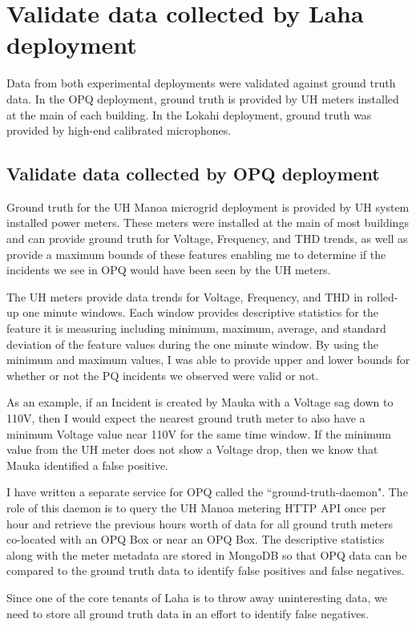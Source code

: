 \section{Validate data collected by Laha deployment}
Data from both experimental deployments were validated against ground truth data. In the OPQ deployment, ground truth is provided by UH meters installed at the main of each building. In the Lokahi deployment, ground truth was provided by high-end calibrated microphones. 

\subsection{Validate data collected by OPQ deployment}

Ground truth for the UH Manoa microgrid deployment is provided by UH system installed power meters. These meters were installed at the main of most buildings and can provide ground truth for Voltage, Frequency, and THD trends, as well as provide a maximum bounds of these features enabling me to determine if the incidents we see in OPQ would have been seen by the UH meters.

The UH meters provide data trends for Voltage, Frequency, and THD in rolled-up one minute windows. Each window provides descriptive statistics for the feature it is measuring including minimum, maximum, average, and standard deviation of the feature values during the one minute window. By using the minimum and maximum values, I was able to provide upper and lower bounds for whether or not the PQ incidents we observed were valid or not. 

As an example, if an Incident is created by Mauka with a Voltage sag down to 110V, then I would expect the nearest ground truth meter to also have a minimum Voltage value near 110V for the same time window. If the minimum value from the UH meter does not show a Voltage drop, then we know that Mauka identified a false positive.

I have written a separate service for OPQ called the ``ground-truth-daemon". The role of this daemon is to query the UH Manoa metering HTTP API once per hour and retrieve the previous hours worth of data for all ground truth meters co-located with an OPQ Box or near an OPQ Box. The descriptive statistics along with the meter metadata are stored in MongoDB so that OPQ data can be compared to the ground truth data to identify false positives and false negatives.

Since one of the core tenants of Laha is to throw away uninteresting data, we need to store all ground truth data in an effort to identify false negatives. 

